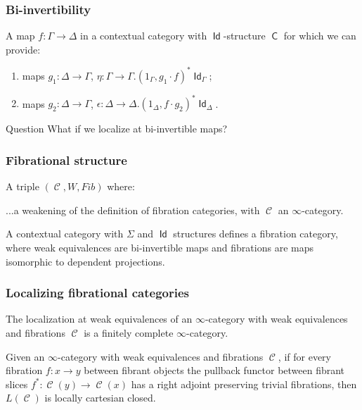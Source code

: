 \documentclass{beamer}
\DeclareMathOperator{\Id}{\mathsf{Id}}
\DeclareMathOperator{\sfC}{\mathsf{C}}
\DeclareMathOperator{\cC}{\mathcal{C}}
\begin{document}
\begin{frame}
  \frametitle{Bi-invertibility}

  \begin{defn}
    A map $f\colon\Gamma\rightarrow\Delta$ in a contextual category with
    $\Id$-structure $\sfC$ for which we can provide:
    \begin{enumerate}
      \item maps $g_1\colon\Delta\rightarrow\Gamma$,
        $\eta\colon\Gamma\rightarrow\Gamma.(1_\Gamma,g_1\cdot f)^*\Id_\Gamma$;
      \item maps $g_2\colon\Delta\rightarrow\Gamma$,
        $\epsilon\colon\Delta\rightarrow\Delta.(1_\Delta,f\cdot g_2)^*\Id_\Delta$.
    \end{enumerate}
  \end{defn}
  \pause

  \begin{block}{Question}
    What if we localize at bi-invertible maps?
  \end{block}
\end{frame}

\begin{frame}
  \frametitle{Fibrational structure}
  
  \begin{defn}
    A triple $(\cC,W,Fib)$ where:

    ...a weakening of the definition of fibration categories, with $\cC$ an
    $\infty$-category.
  \end{defn}
  \pause

  \begin{thm}
    A contextual category with $\Sigma$ and $\Id$ structures defines a
    fibration category, where weak
    equivalences are bi-invertible maps and
    fibrations are maps isomorphic to  dependent projections.
  \end{thm}
\end{frame}

\begin{frame}
  \frametitle{Localizing fibrational categories}

  \begin{prop}[Cisinski]
    The localization at weak equivalences of an $\infty$-category with weak
    equivalences and fibrations $\cC$ is a finitely complete $\infty$-category.
  \end{prop}

  \begin{prop}[Cisinski]
    Given an $\infty$-category with weak equivalences and fibrations $\cC$, if
    for every fibration $f\colon x\rightarrow y$ between fibrant objects the
    pullback functor between fibrant slices $f^*\colon\cC(y)\rightarrow\cC(x)$
    has a right adjoint preserving trivial fibrations, then $L(\cC)$ is locally
    cartesian closed.
  \end{prop}
\end{frame}
\end{document}
